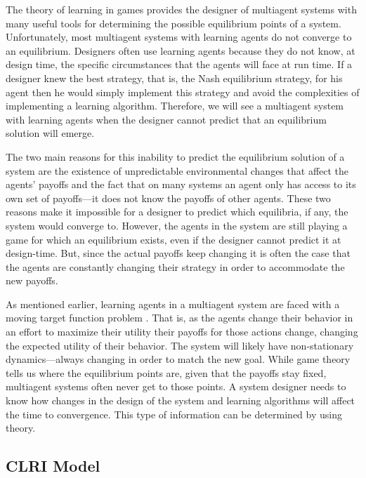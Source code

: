 The theory of learning in games provides the designer of multiagent
systems with many useful tools for determining the possible
equilibrium points of a system. Unfortunately, most multiagent systems
with learning agents do not converge to an equilibrium. Designers
often use learning agents because they do not know, at design time,
the specific circumstances that the agents will face at run time.  If
a designer knew the best strategy, that is, the Nash equilibrium
strategy, for his agent then he would simply implement this strategy
and avoid the complexities of implementing a learning algorithm.
Therefore, we will see a multiagent system with learning agents when
the designer cannot predict that an equilibrium solution will emerge.

The two main reasons for this inability to predict the equilibrium
solution of a system are the existence of unpredictable environmental
changes that affect the agents' payoffs and the fact that on many
systems an agent only has access to its own set of payoffs---it does
not know the payoffs of other agents. These two reasons make it
impossible for a designer to predict which equilibria, if any, the
system would converge to. However, the agents in the system are still
playing a game for which an equilibrium exists, even if the designer
cannot predict it at design-time. But, since the actual payoffs keep
changing it is often the case that the agents are constantly changing
their strategy in order to accommodate the new payoffs.

As mentioned earlier, learning agents in a multiagent system are faced
with a moving target function problem \cite{vidal:98a}. That is, as
the agents change their behavior in an effort to maximize their
utility their payoffs for those actions change, changing the expected
utility of their behavior. The system will likely have non-stationary
dynamics---always changing in order to match the new goal. While game
theory tells us where the equilibrium points are, given that the
payoffs stay fixed, multiagent systems often never get to those
points.  A system designer needs to know how changes in the design of
the system and learning algorithms will affect the time to
convergence.  This type of information can be determined by using
 theory.

\subsection{CLRI Model}
\label{sec:clri-theory}

